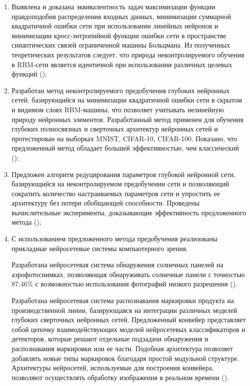 \begin{enumerate}[wide, labelindent=10mm]

\item Выявлена и доказана эквивалентность задач максимизации функции правдоподобия распределения входных данных, минимизации суммарной квадратичной ошибки сети при использовании линейных нейронов и минимизации кросс-энтропийной функции ошибки сети в пространстве синаптических связей ограниченной машины Больцмана. Из полученных теоретических результатов следует, что природа неконтролируемого обучения в RBM-сети является идентичной при использовании различных целевых функций (\cite{2-A, 3-A, 4-A, 5-A, 10-A, 12-A, 13-A});
\item Разработан метод неконтролируемого предобучения глубоких нейронных сетей, базирующийся на минимизации квадратичной ошибки сети в скрытом и видимом слоях RBM-машины, что позволяет учитывать нелинейную природу нейронных элементов. Разработанный метод применен для обучения глубоких полносвязных и сверточных архитектур нейронных сетей и протестирован на выборках MNIST, CIFAR-10, CIFAR-100. Показано, что предложенный метод обладает большей эффективностью, чем классический (\cite{1-A, 2-A, 3-A, 4-A, 5-A, 10-A, 12-A, 13-A, 17-A, 18-A, 19-A, 20-A, 21-A, 22-A});
\item Предложен алгоритм редуцирования параметров глубокой нейронной сети, базирующийся на неконтролируемом предобучении сети и позволяющий сократить количество настраиваемых параметров сети и упростить ее архитектуру без потери обобщающей способности. Проведены вычислительные эксперименты, доказывающие эффективность предложенного метода (\cite{11-A, 16-A, 30-A});
\item С использованием предложенного метода предобучения реализованы прикладные нейросетевые системы компьютерного зрения. 

Разработана нейросетевая система обнаружения солнечных панелей на аэрофотоснимках, позволяющая обнаруживать солнечные панели с точностью 87,46\% с возможностью использования фотографий низкого разрешения (\cite{9-A, 14-A, 15-A}).

Разработана нейросетевая система распознавания маркировки продукта на производственной линии, базирующаяся на интеграции различных моделей глубоких сверточных нейронных сетей. Предложенный конвейер представляет собой цепочку взаимодействующих моделей нейросетевых классификаторов и детекторов, которые решают отдельные подзадачи обнаружения и распознавания маркировки или ее части. Подобная архитектура позволяет добавлять новые типы маркировок благодаря простой модульной структуре. Архитектуры нейросетей, используемые для построения конвейера, позволяют осуществлять обработку изображения в реальном времени (\cite{6-A, 7-A, 8-A, 23-A, 24-A, 25-A, 26-A, 27-A, 28-A, 29-A}).


\end{enumerate}
